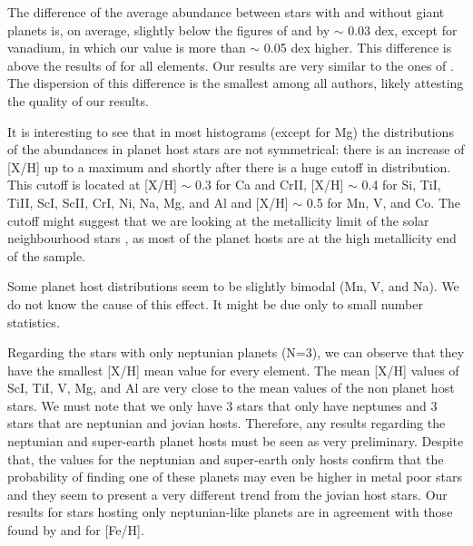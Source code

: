 \documentclass[oldversion]{aa}
\begin{document}
The difference of the average abundance between stars with and without giant planets is, on average, slightly below the figures of \citet{Bodaghee-2003} and \citet{Gilli-2006} by $\sim$ 0.03 dex, except for vanadium, in which our value is more than $\sim$ 0.05 dex higher. This difference is above the results of \citet{Bond-2006} for all elements. Our results are very similar to the ones of \citet{Takeda-2007}. The dispersion of this difference is the smallest among all authors, likely attesting the quality of our results.

It is interesting to see that in most histograms (except for Mg) the distributions of the abundances in planet host stars are not symmetrical: there is an increase of [X/H] up to a maximum and shortly after there is a huge cutoff in distribution. This cutoff is located at [X/H] $\sim$ 0.3 for Ca and CrII, [X/H] $\sim$ 0.4 for Si, TiI, TiII, ScI, ScII, CrI, Ni, Na, Mg, and Al and [X/H] $\sim$ 0.5 for Mn, V, and Co. The cutoff might suggest that we are looking at the metallicity limit of the solar neighbourhood stars  \citep[e.g.][]{Santos-2003}, as most of the planet hosts are at the high metallicity end of the sample.

Some planet host distributions seem to be slightly bimodal (Mn, V, and Na). We do not know the cause of this effect. It might be due only to small number statistics.

Regarding the stars with only neptunian planets (N=3), we can observe that they have the smallest [X/H] mean value for every element. The mean [X/H] values of ScI, TiI, V, Mg, and Al are very close to the mean values of the non planet host stars. %
We must note that we only have 3 stars that only have neptunes and 3 stars that are neptunian and jovian hosts. Therefore, any results regarding the neptunian and super-earth planet hosts must be seen as very preliminary. Despite that, the values for the neptunian and super-earth only hosts confirm that the probability of finding one of these planets may even be higher in metal poor stars and they seem to present a very different trend from the jovian host stars. Our results for stars hosting only neptunian-like planets are in agreement with those found by \citet{Udry-2006, Udry-2007b} and \citet{Sousa-2008} for [Fe/H].

\end{document}
